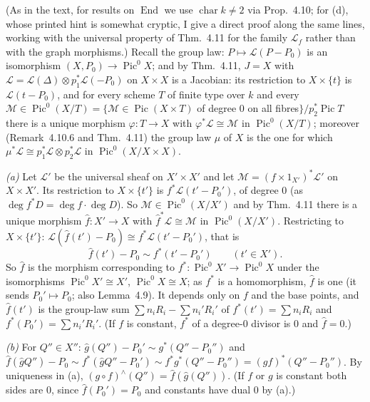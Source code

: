 \documentclass[11pt]{article}
\begin{document}
\pf
(As in the text, for results on $\operatorname{End}$ we use $\operatorname{char}k\ne2$ via Prop.~4.10; for (d), whose printed hint is somewhat cryptic, I give a direct proof along the same lines, working with the universal property of Thm.~4.11 for the family $\mathcal L_f$ rather than with the graph morphisms.) Recall the group law: $P\mapsto\mathcal L(P-P_0)$ is an isomorphism $(X,P_0)\to\operatorname{Pic}^0X$; and by Thm.~4.11, $J=X$ with $\mathcal L=\mathcal L(\Delta)\otimes p_1^*\mathcal L(-P_0)$ on $X\times X$ is a Jacobian: its restriction to $X\times\{t\}$ is $\mathcal L(t-P_0)$, and for every scheme $T$ of finite type over $k$ and every $\mathcal M\in\operatorname{Pic}^0(X/T)=\{\mathcal M\in\operatorname{Pic}(X\times T)$ of degree $0$ on all fibres$\}/p_2^*\operatorname{Pic}T$ there is a unique morphism $\varphi:T\to X$ with $\varphi^*\mathcal L\cong\mathcal M$ in $\operatorname{Pic}^0(X/T)$; moreover (Remark~4.10.6 and Thm.~4.11) the group law $\mu$ of $X$ is the one for which $\mu^*\mathcal L\cong p_1^*\mathcal L\otimes p_2^*\mathcal L$ in $\operatorname{Pic}^0(X/X\times X)$.

\emph{(a)} Let $\mathcal L'$ be the universal sheaf on $X'\times X'$ and let $\mathcal M=(f\times1_{X'})^*\mathcal L'$ on $X\times X'$. Its restriction to $X\times\{t'\}$ is $f^*\mathcal L(t'-P_0')$, of degree $0$ (as $\deg f^*D=\deg f\cdot\deg D$). So $\mathcal M\in\operatorname{Pic}^0(X/X')$ and by Thm.~4.11 there is a unique morphism $\hat f:X'\to X$ with $\hat f^*\mathcal L\cong\mathcal M$ in $\operatorname{Pic}^0(X/X')$. Restricting to $X\times\{t'\}$: $\mathcal L(\hat f(t')-P_0)\cong f^*\mathcal L(t'-P_0')$, that is
\[ \hat f(t')-P_0\sim f^*(t'-P_0')\qquad(t'\in X'). \]
So $\hat f$ is the morphism corresponding to $f^*:\operatorname{Pic}^0X'\to\operatorname{Pic}^0X$ under the isomorphisms $\operatorname{Pic}^0X'\cong X'$, $\operatorname{Pic}^0X\cong X$; as $f^*$ is a homomorphism, $\hat f$ is one (it sends $P_0'\mapsto P_0$; also Lemma~4.9). It depends only on $f$ and the base points, and $\hat f(t')$ is the group-law sum $\sum n_iR_i-\sum n_i'R_i'$ of $f^*(t')=\sum n_iR_i$ and $f^*(P_0')=\sum n_i'R_i'$. (If $f$ is constant, $f^*$ of a degree-$0$ divisor is $0$ and $\hat f=0$.)

\emph{(b)} For $Q''\in X''$: $\hat g(Q'')-P_0'\sim g^*(Q''-P_0'')$ and $\hat f(\hat gQ'')-P_0\sim f^*(\hat gQ''-P_0')\sim f^*g^*(Q''-P_0'')=(gf)^*(Q''-P_0'')$. By uniqueness in (a), $(g\circ f)^\wedge(Q'')=\hat f(\hat g(Q''))$. (If $f$ or $g$ is constant both sides are $0$, since $\hat f(P_0')=P_0$ and constants have dual $0$ by (a).)
\end{document}
